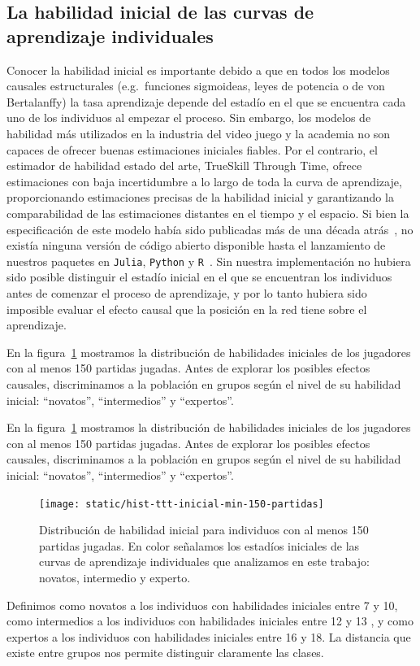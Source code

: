 \documentclass[a4paper,11pt]{book}
\theoremstyle{definition}
\begin{document}
\subsection{La habilidad inicial de las curvas de aprendizaje individuales}\label{sec:initial_ability}


Conocer la habilidad inicial es importante debido a que en todos los modelos causales estructurales (e.g.~funciones sigmoideas, leyes de potencia o de von Bertalanffy) la tasa aprendizaje depende del estad\'io en el que se encuentra cada uno de los individuos al empezar el proceso.
%
Sin embargo, los modelos de habilidad m\'as utilizados en la industria del video juego y la academia no son capaces de ofrecer buenas estimaciones iniciales fiables.
%
Por el contrario, el estimador de habilidad estado del arte, TrueSkill Through Time, ofrece estimaciones con baja incertidumbre a lo largo de toda la curva de aprendizaje, proporcionando estimaciones precisas de la habilidad inicial y garantizando la comparabilidad de las estimaciones distantes en el tiempo y el espacio.
%
Si bien la especificaci\'on de este modelo hab\'ia sido publicadas m\'as de una d\'ecada atr\'as~\cite{Dangauthier2007}, no exist\'ia ninguna versi\'on de c\'odigo abierto disponible hasta el lanzamiento de nuestros paquetes en \texttt{Julia}, \texttt{Python} y \texttt{R}~\cite{Landfried2021-TTT}.
%
Sin nuestra implementaci\'on no hubiera sido posible distinguir el estad\'io inicial en el que se encuentran los individuos antes de comenzar el proceso de aprendizaje, y por lo tanto hubiera sido imposible evaluar el efecto causal que la posici\'on en la red tiene sobre el aprendizaje.


En la figura~\ref{Figuras.HistogramaTTTInicial} mostramos la distribuci\'on de habilidades iniciales de los jugadores con al menos 150 partidas jugadas.
%
Antes de explorar los posibles efectos causales, discriminamos a la poblaci\'on en grupos seg\'un el nivel de su habilidad inicial: ``novatos'', ``intermedios'' y ``expertos''.
%

En la figura~\ref{Figuras.HistogramaTTTInicial} mostramos la distribuci\'on de habilidades iniciales de los jugadores con al menos 150 partidas jugadas.
%
Antes de explorar los posibles efectos causales, discriminamos a la poblaci\'on en grupos seg\'un el nivel de su habilidad inicial: ``novatos'', ``intermedios'' y ``expertos''.
%
\begin{figure}[ht!]
 	\centering
	\texttt{[image: static/hist-ttt-inicial-min-150-partidas]}
	\caption{
	Distribuci\'on de habilidad inicial para individuos con al menos 150 partidas jugadas. En color se\~nalamos los estad\'ios iniciales de las curvas de aprendizaje individuales que analizamos en este trabajo: novatos, intermedio y experto.
	}
	\label{Figuras.HistogramaTTTInicial}
 \end{figure}
%
Definimos como novatos a los individuos con habilidades iniciales entre 7 y 10, como intermedios a los individuos con habilidades iniciales entre 12 y 13 , y como expertos a los individuos con habilidades iniciales entre 16 y 18.
%
La distancia que existe entre grupos nos permite distinguir claramente las clases.
\end{document}
